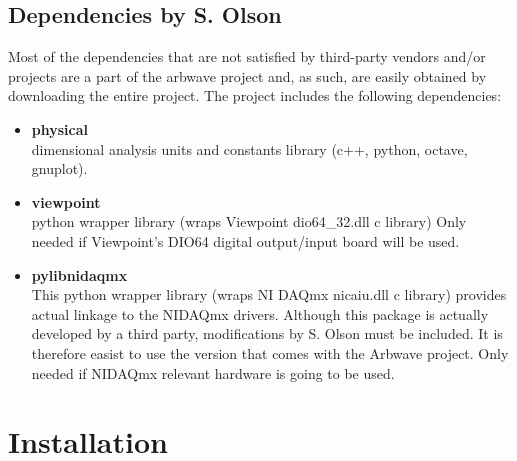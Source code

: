 \subsection{Dependencies by S. Olson}
Most of the dependencies that are not satisfied by third-party vendors and/or
projects are a part of the arbwave project and, as such, are easily obtained by
downloading the entire project.  The project includes the following
dependencies:
\begin{itemize}
\item \textbf{physical} \\
  dimensional analysis
  units and constants library (c++, python, octave, gnuplot).
\item \textbf{viewpoint} \\
  python wrapper library (wraps Viewpoint dio64\_32.dll c library)
  Only needed if Viewpoint's DIO64 digital output/input board will be used.
\item \textbf{pylibnidaqmx} \\
  This python wrapper library (wraps NI DAQmx nicaiu.dll c library) provides
  actual linkage to the NIDAQmx drivers.  Although this package is actually
  developed by a third party, modifications by S. Olson must be included.  It is
  therefore easist to use the version that comes with the Arbwave project.
  Only needed if NIDAQmx relevant hardware is going to be used.
\end{itemize}

\section{Installation}

